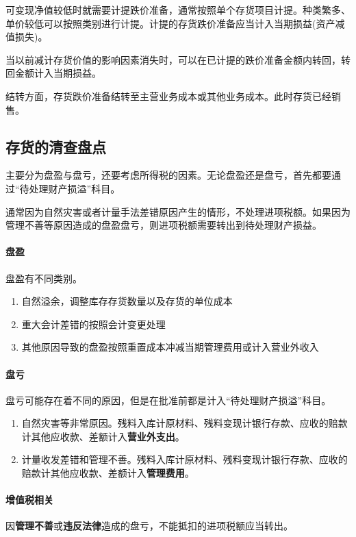 \documentclass[UTF8,12pt]{ctexart}
\numberwithin{equation}{section} %
\numberwithin{figure}{section}
\numberwithin{table}{section}
\begin{document}
	可变现净值较低时就需要计提跌价准备，通常按照单个存货项目计提。种类繁多、单价较低可以按照类别进行计提。计提的存货跌价准备应当计入当期损益(资产减值损失)。
	
	当以前减计存货价值的影响因素消失时，可以在已计提的跌价准备金额内转回，转回金额计入当期损益。
	
	结转方面，存货跌价准备结转至主营业务成本或其他业务成本。此时存货已经销售。
	
	\subsection{存货的清查盘点}
	
	主要分为盘盈与盘亏，还要考虑所得税的因素。无论盘盈还是盘亏，首先都要通过“待处理财产损溢”科目。
	
	通常因为自然灾害或者计量手法差错原因产生的情形，不处理进项税额。如果因为管理不善等原因造成的盘盈盘亏，则进项税额需要转出到待处理财产损益。
	
	\paragraph{盘盈} 盘盈有不同类别。
	\begin{enumerate}
		\item 自然溢余，调整库存存货数量以及存货的单位成本
		
		\item 重大会计差错的按照会计变更处理
		
		\item 其他原因导致的盘盈按照重置成本冲减当期管理费用或计入营业外收入
	\end{enumerate}
	
	
	\paragraph{盘亏} 盘亏可能存在着不同的原因，但是在批准前都是计入“待处理财产损溢”科目。
	\begin{enumerate}
		\item 自然灾害等非常原因。残料入库计原材料、残料变现计银行存款、应收的赔款计其他应收款、差额计入\textbf{营业外支出}。
		
		\item 计量收发差错和管理不善。残料入库计原材料、残料变现计银行存款、应收的赔款计其他应收款、差额计入\textbf{管理费用}。
		
	\end{enumerate}
	
	\paragraph{增值税相关}
	因\textbf{管理不善}或\textbf{违反法律}造成的盘亏，不能抵扣的进项税额应当转出。
	
\end{document}
